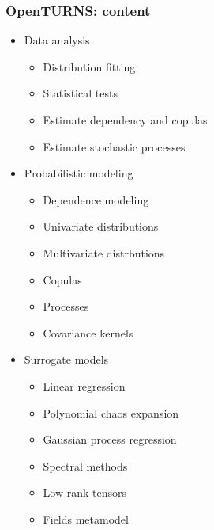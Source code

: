 \documentclass{beamer}
\begin{document}
    \begin{frame}[containsverbatim]
      \frametitle{OpenTURNS: content}

      \begin{scriptsize}

      \begin{minipage}[t]{0.33\textwidth}
      \begin{itemize}
      \item Data analysis
      \begin{itemize}
      \tiny
      \item Distribution fitting
      \item Statistical tests
      \item Estimate dependency and copulas
      \item Estimate stochastic processes
      \end{itemize}
      \end{itemize}
      \end{minipage}%
      \begin{minipage}[t]{0.33\textwidth}
      \begin{itemize}
      \item Probabilistic modeling
      \begin{itemize}
      \tiny
      \item Dependence modeling
      \item Univariate distributions
      \item Multivariate distrbutions
      \item Copulas
      \item Processes
      \item Covariance kernels
      \end{itemize}
      \end{itemize}
      \end{minipage}%
      \begin{minipage}[t]{0.33\textwidth}
      \begin{itemize}
      \item Surrogate models
      \begin{itemize}
      \tiny
      \item Linear regression
      \item Polynomial chaos expansion
      \item Gaussian  process regression
      \item Spectral methods
      \item Low rank tensors
      \item Fields metamodel
      \end{itemize}
      \end{itemize}
      \end{minipage}


\end{scriptsize}
\end{frame}
\end{document}
